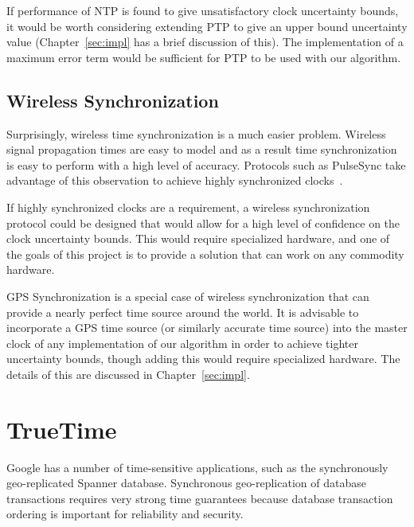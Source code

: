 If performance of NTP is found to give unsatisfactory clock uncertainty bounds,
it would be worth considering extending PTP to give an upper bound uncertainty
value (Chapter~\ref{sec:impl} 
has a brief discussion of this). The implementation of a maximum error term 
would be sufficient for PTP to be used with our algorithm. 


\subsection{Wireless Synchronization}

Surprisingly, wireless time synchronization is a much easier
problem. Wireless signal propagation times are easy to model and
as a result time synchronization is easy to perform with a high
level of accuracy. Protocols such as PulseSync take advantage of this
observation to achieve highly synchronized clocks~\citep{Lenzen2010}.

If highly synchronized clocks are a requirement, a wireless
synchronization protocol could be designed that would allow for
a high level of confidence on the clock uncertainty bounds. 
This would require specialized hardware, and one of the goals of 
this project is to provide a solution that can work on any commodity hardware. 

GPS Synchronization is a special case of wireless synchronization that
can provide a nearly perfect time source around the world. It is
advisable to incorporate a GPS time source (or similarly accurate time
source) into the master clock of any implementation of our
algorithm in order to achieve tighter uncertainty bounds, 
though adding this would require specialized hardware.
The details of this are discussed in Chapter~\ref{sec:impl}.

\section{TrueTime}

Google has a number of time-sensitive applications, such as
the synchronously geo-replicated Spanner database. Synchronous
geo-replication of database transactions requires very strong time
guarantees because database transaction ordering is important for 
reliability and security. 

